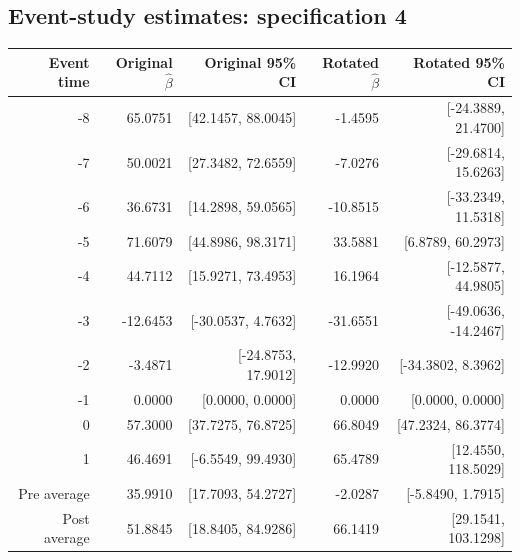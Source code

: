 \documentclass[10pt]{article}
\begin{document}
\subsection*{Event-study estimates: specification 4}
\begin{center}\scriptsize
\begin{tabular}{r rr rr}
\toprule
Event time & Original $\hat\beta$ & Original 95\% CI & Rotated $\hat\beta$ & Rotated 95\% CI \\
\midrule
-8 & 65.0751 & [42.1457, 88.0045] & -1.4595 & [-24.3889, 21.4700] \\
-7 & 50.0021 & [27.3482, 72.6559] & -7.0276 & [-29.6814, 15.6263] \\
-6 & 36.6731 & [14.2898, 59.0565] & -10.8515 & [-33.2349, 11.5318] \\
-5 & 71.6079 & [44.8986, 98.3171] & 33.5881 & [6.8789, 60.2973] \\
-4 & 44.7112 & [15.9271, 73.4953] & 16.1964 & [-12.5877, 44.9805] \\
-3 & -12.6453 & [-30.0537, 4.7632] & -31.6551 & [-49.0636, -14.2467] \\
-2 & -3.4871 & [-24.8753, 17.9012] & -12.9920 & [-34.3802, 8.3962] \\
-1 & 0.0000 & [0.0000, 0.0000] & 0.0000 & [0.0000, 0.0000] \\
0 & 57.3000 & [37.7275, 76.8725] & 66.8049 & [47.2324, 86.3774] \\
1 & 46.4691 & [-6.5549, 99.4930] & 65.4789 & [12.4550, 118.5029] \\
\midrule
Pre average & 35.9910 & [17.7093, 54.2727] & -2.0287 & [-5.8490, 1.7915] \\
Post average & 51.8845 & [18.8405, 84.9286] & 66.1419 & [29.1541, 103.1298] \\
\bottomrule
\end{tabular}
\end{center}
\clearpage
\end{document}
